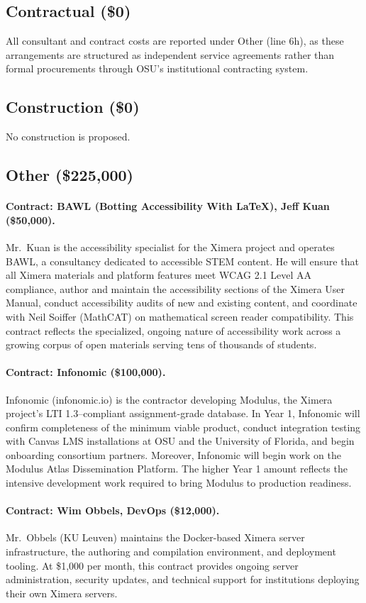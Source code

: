\documentclass[12pt,letterpaper]{article}
\newcommand{\budgetcat}[1]{\subsection*{#1}}
\begin{document}
\budgetcat{Contractual (\$0)}

All consultant and contract costs are reported under Other (line 6h), as these arrangements are structured as independent service agreements rather than formal procurements through OSU's institutional contracting system.


\budgetcat{Construction (\$0)}
No construction is proposed.

\budgetcat{Other (\$225,000)}


\paragraph{Contract: BAWL (Botting Accessibility With \LaTeX), Jeff Kuan (\$50,000).} Mr.\ Kuan is the accessibility specialist for the Ximera project and operates BAWL, a consultancy dedicated to accessible STEM content. He will ensure that all Ximera materials and platform features meet WCAG 2.1 Level AA compliance, author and maintain the accessibility sections of the Ximera User Manual, conduct accessibility audits of new and existing content, and coordinate with Neil Soiffer (MathCAT) on mathematical screen reader compatibility. This contract reflects the specialized, ongoing nature of accessibility work across a growing corpus of open materials serving tens of thousands of students.

\paragraph{Contract: Infonomic (\$100,000).} Infonomic (infonomic.io) is the contractor developing Modulus, the Ximera project's LTI 1.3--compliant assignment-grade database. In Year 1, Infonomic will confirm completeness of the minimum viable product, conduct integration testing with Canvas LMS installations at OSU and the University of Florida, and begin onboarding consortium partners. Moreover, Infonomic will begin work on the Modulus Atlas Dissemination Platform. The higher Year 1 amount reflects the intensive development work required to bring Modulus to production readiness. 

\paragraph{Contract: Wim Obbels, DevOps (\$12,000).} Mr.\ Obbels (KU Leuven) maintains the Docker-based Ximera server infrastructure, the authoring and compilation environment, and deployment tooling. At \$1,000 per month, this contract provides ongoing server administration, security updates, and technical support for institutions deploying their own Ximera servers.
\end{document}
